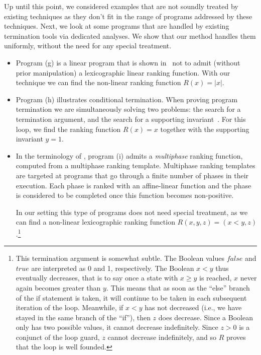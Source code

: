 \documentclass[preprint]{sigplanconf}
\theoremstyle{definition}
\begin{document}
Up until this point, we considered examples that are not soundly treated by
existing techniques as they don't fit in the range of programs addressed by
these techniques.  Next, we look at some programs that are handled by
existing termination tools via dedicated analyses.  We show that our method
handles them uniformly, without the need for any special treatment.
%
\begin{itemize}

\item Program (g) is a linear program that is shown
in~\cite{DBLP:conf/tacas/CookSZ13} not to admit (without prior manipulation)
a lexicographic linear ranking function.  With our technique we can find the
non-linear ranking function $R(x) = |x|$.


\item Program (h) illustrates conditional termination.  When proving program
termination we are simultaneously solving two problems: the search for a
termination argument, and the search for a supporting
invariant~\cite{DBLP:conf/cav/BrockschmidtCF13}.  For this loop, we find the
ranking function $R(x) = x$ together with the supporting invariant $y=1$.

\item In the terminology of \cite{DBLP:conf/tacas/LeikeH14}, program (i)
admits a \emph{multiphase} ranking function, computed from a multiphase
ranking template.  Multiphase ranking templates are targeted at programs
that go through a finite number of phases in their execution.  Each phase is
ranked with an affine-linear function and the phase is considered to be
completed once this function becomes non-positive.

In our setting this type of programs does not need special treatment, as we
can find a non-linear lexicographic ranking function $R(x, y, z) = (x < y,
z)$.\footnote{This termination argument is somewhat subtle.  The Boolean
values $\mathit{false}$ and $\mathit{true}$ are interpreted as 0 and 1,
respectively.  The Boolean $x < y$ thus eventually decreases, that is to say
once a state with $x \geq y$ is reached, $x$ never again becomes greater
than $y$.  This means that as soon as the ``else'' branch of the if
statement is taken, it will continue to be taken in each subsequent
iteration of the loop.  Meanwhile, if $x < y$ has not decreased (i.e., we
have stayed in the same branch of the ``if''), then $z$ does decrease. 
Since a Boolean only has two possible values, it cannot decrease
indefinitely.  Since $z > 0$ is a conjunct of the loop guard, $z$ cannot
decrease indefinitely, and so $R$ proves that the loop is well founded.}


\end{itemize}
\end{document}
